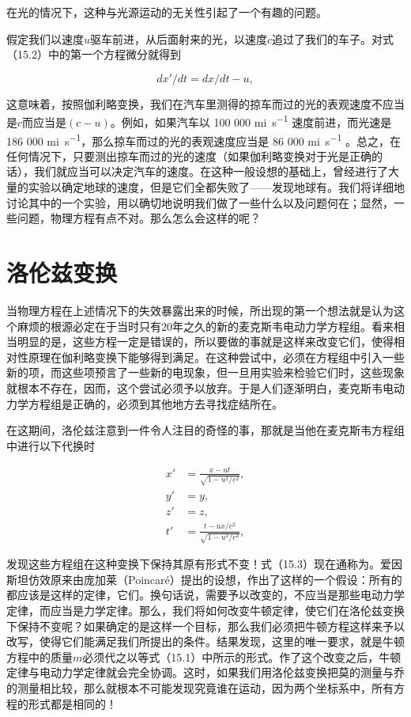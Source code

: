\documentclass[12pt,oneside]{book}
\begin{document}
在光的情况下，这种与光源运动的无关性引起了一个有趣的问题。


假定我们以速度$u$驱车前进，从后面射来的光，以速度$c$追过了我们的车子。对式（15.2）中的第一个方程微分就得到


\begin{equation*}
dx'/dt=dx/dt-u,
\end{equation*}

这意味着，按照伽利略变换，我们在汽车里测得的掠车而过的光的表观速度不应当是$c$而应当是$(c - u)$。例如，如果汽车以 100 000 \unit{mi.s^{-1}} 速度前进，而光速是 186 000 \unit{mi.s^{-1}}，那么掠车而过的光的表观速度应当是 86 000  \unit{mi.s^{-1}} 。总之，在任何情况下，只要测出掠车而过的光的速度（如果伽利略变换对于光是正确的话），我们就应当可以决定汽车的速度。在这种一般设想的基础上，曾经进行了大量的实验以确定地球的速度，但是它们全都失败了——发现地球有。我们将详细地讨论其中的一个实验，用以确切地说明我们做了一些什么以及问题何在；显然，一些问题，物理方程有点不对。那么怎么会这样的呢？


\section{洛伦兹变换}
当物理方程在上述情况下的失效暴露出来的时候，所出现的第一个想法就是认为这个麻烦的根源必定在于当时只有20年之久的新的麦克斯韦电动力学方程组。看来相当明显的是，这些方程一定是错误的，所以要做的事就是这样来改变它们，使得相对性原理在伽利略变换下能够得到满足。在这种尝试中，必须在方程组中引入一些新的项，而这些项预言了一些新的电现象，但一旦用实验来检验它们时，这些现象就根本不存在，因而，这个尝试必须予以放弃。于是人们逐渐明白，麦克斯韦电动力学方程组是正确的，必须到其他地方去寻找症结所在。

在这期间，洛伦兹注意到一件令人注目的奇怪的事，那就是当他在麦克斯韦方程组中进行以下代换时

\begin{equation}
\begin{aligned}
x'&=\frac{x-ut}{\sqrt{1-u^2/c^2}},\\
y'&=y,\\[2ex]
z'&=z,\\
t'&=\frac{t-ux/c^2}{\sqrt{1-u^2/c^2}},
\end{aligned}
\label{Eq:I:15:3}
\end{equation}

发现这些方程组在这种变换下保持其原有形式不变！式（15.3）现在通称为。爱因斯坦仿效原来由庞加莱（Poincaré）提出的设想，作出了这样的一个假设：所有的都应该是这样的定律，它们。换句话说，需要予以改变的，不应当是那些电动力学定律，而应当是力学定律。那么，我们将如何改变牛顿定律，使它们在洛伦兹变换下保持不变呢？如果确定的是这样一个目标，那么我们必须把牛顿方程这样来予以改写，使得它们能满足我们所提出的条件。结果发现，这里的唯一要求，就是牛顿方程中的质量$ m $必须代之以等式（15.1）中所示的形式。作了这个改变之后，牛顿定律与电动力学定律就会完全协调。这时，如果我们用洛伦兹变换把莫的测量与乔的测量相比较，那么就根本不可能发现究竟谁在运动，因为两个坐标系中，所有方程的形式都是相同的！
\end{document}
